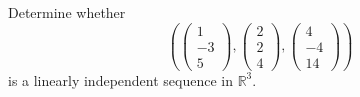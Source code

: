 \documentclass[12pt]{article}
\newenvironment{problem}[2][Problem]
{
	\begin{trivlist} 
		\item[\hskip \labelsep {\bfseries #1 #2:}]
	}
{
	\end{trivlist}
	}
\newenvironment{solution}[1][Solution]
{
	\begin{trivlist} 
		\item[\hskip \labelsep {\itshape #1:}]
	}
	{
	\end{trivlist}
}
\begin{document}
\begin{problem}{1}
Determine whether
\[
\left(\begin{pmatrix}1\\-3\\5\end{pmatrix}, \begin{pmatrix}2\\2\\4\end{pmatrix}, \begin{pmatrix}4\\-4\\14\end{pmatrix}\right)
\]
is a linearly independent sequence in $\mathbb{R}^3$.
\noindent
\newline
\newline
\begin{solution}

\end{solution}
\end{problem}
\end{document}
